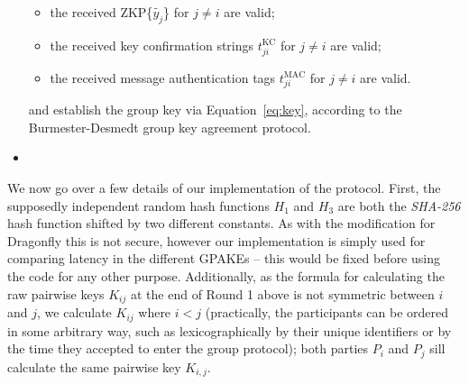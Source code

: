 \begin{itemize}
    \begin{itemize}
            \item the received ZKP\{$\tilde{y_j}$\} for $j \neq i$ are valid;
            \item the received key confirmation strings $t^{\text{KC}}_{ji}$ for $j \neq i$ are valid;
            \item the received message authentication tags $t^{\text{MAC}}_{ji}$ for $j \neq i$ are valid.
        \end{itemize}
        and establish the group key via Equation~\eqref{eq:key}, according to the Burmester-Desmedt group key agreement protocol.
        \item[]
\end{itemize}

We now go over a few details of our implementation of the
protocol. First, the supposedly independent random hash functions $H_1$ and $H_3$ are both the
 \textit{SHA-256} hash function shifted by two different constants. As with the modification for Dragonfly this is not
secure, however our implementation is simply used for comparing latency in the different GPAKEs -- this would be fixed 
before using the code for any other purpose.  Additionally,
as the formula for calculating the raw pairwise keys $K_{ij}$ at the end of
Round 1 above is not symmetric between $i$ and $j$, we calculate $K_{ij}$ where $i < j$ (practically, the 
participants can be ordered in some arbitrary way, such as lexicographically by their unique identifiers 
or by the time they accepted to enter the group protocol); both parties $P_i$ and $P_j$ sill calculate the same pairwise key $K_{i,j}$.


